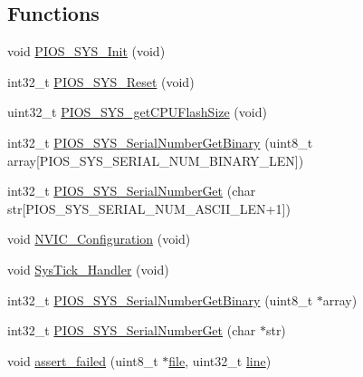 \subsection*{\-Functions}
\begin{DoxyCompactItemize}
\item 
void \hyperlink{group___p_i_o_s___s_y_s_gaec647868ac486506b195fa5272cbdb92}{\-P\-I\-O\-S\-\_\-\-S\-Y\-S\-\_\-\-Init} (void)
\item 
int32\-\_\-t \hyperlink{group___p_i_o_s___s_y_s_ga2acb35c64cd66c4e731cea5a2c855de0}{\-P\-I\-O\-S\-\_\-\-S\-Y\-S\-\_\-\-Reset} (void)
\item 
uint32\-\_\-t \hyperlink{group___p_i_o_s___s_y_s_gab274e5bc3b8d70ca08701eb04f783bc3}{\-P\-I\-O\-S\-\_\-\-S\-Y\-S\-\_\-get\-C\-P\-U\-Flash\-Size} (void)
\item 
int32\-\_\-t \hyperlink{group___p_i_o_s___s_y_s_ga2e1f3aaafed672c51239e5a84d752b1f}{\-P\-I\-O\-S\-\_\-\-S\-Y\-S\-\_\-\-Serial\-Number\-Get\-Binary} (uint8\-\_\-t array\mbox{[}\-P\-I\-O\-S\-\_\-\-S\-Y\-S\-\_\-\-S\-E\-R\-I\-A\-L\-\_\-\-N\-U\-M\-\_\-\-B\-I\-N\-A\-R\-Y\-\_\-\-L\-E\-N\mbox{]})
\item 
int32\-\_\-t \hyperlink{group___p_i_o_s___s_y_s_ga06a0b401f67617fc771fa8b32d43e7da}{\-P\-I\-O\-S\-\_\-\-S\-Y\-S\-\_\-\-Serial\-Number\-Get} (char str\mbox{[}\-P\-I\-O\-S\-\_\-\-S\-Y\-S\-\_\-\-S\-E\-R\-I\-A\-L\-\_\-\-N\-U\-M\-\_\-\-A\-S\-C\-I\-I\-\_\-\-L\-E\-N+1\mbox{]})
\item 
void \hyperlink{group___p_i_o_s___s_y_s_ga5c12343e267ace8587309499bea6babe}{\-N\-V\-I\-C\-\_\-\-Configuration} (void)
\item 
void \hyperlink{group___p_i_o_s___s_y_s_gab5e09814056d617c521549e542639b7e}{\-Sys\-Tick\-\_\-\-Handler} (void)
\item 
int32\-\_\-t \hyperlink{group___p_i_o_s___s_y_s_ga1f6c965ff057830d198c9ba04b6231bb}{\-P\-I\-O\-S\-\_\-\-S\-Y\-S\-\_\-\-Serial\-Number\-Get\-Binary} (uint8\-\_\-t $\ast$array)
\item 
int32\-\_\-t \hyperlink{group___p_i_o_s___s_y_s_ga479c4a94bf5fd5f9697498bc63284964}{\-P\-I\-O\-S\-\_\-\-S\-Y\-S\-\_\-\-Serial\-Number\-Get} (char $\ast$str)
\item 
void \hyperlink{group___p_i_o_s___s_y_s_ga2532ff72b1a2ff82f65e8c2a5a4dde00}{assert\-\_\-failed} (uint8\-\_\-t $\ast$\hyperlink{group___w_a_v_e_p_l_a_y_e_r___private___variables_ga48b699d30a027a1d6326588c99d716e1}{file}, uint32\-\_\-t \hyperlink{group___p_i_o_s___v_i_d_e_o_ga308d53a9c395c298132110da98adb7c7}{line})
\end{DoxyCompactItemize}


